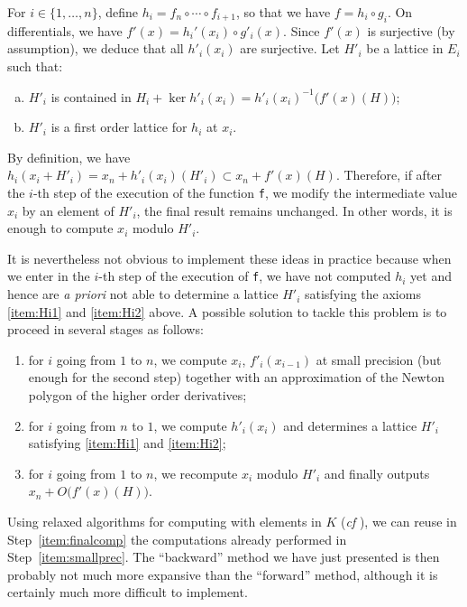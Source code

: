\documentclass{lms}
\begin{document}
For $i \in \{1, \ldots, n\}$, define $h_i = f_n \circ \cdots \circ 
f_{i+1}$, so that we have $f = h_i \circ g_i$. On differentials, we 
have $f'(x) = h_i'(x_i) \circ g'_i(x)$. Since $f'(x)$ is surjective (by 
assumption), we deduce that all $h'_i(x_i)$ are surjective. Let $H'_i$ 
be a lattice in $E_i$ such that:
\begin{enumerate}[(a)] 
\item \label{item:Hi1}
$H'_i$ is contained in $H_i + \ker h'_i(x_i) = h'_i(x_i)^{-1}
\big(f'(x)(H)\big)$;
\item \label{item:Hi2}
$H'_i$ is a first order lattice for $h_i$ at $x_i$.
\end{enumerate}
By definition, we have
$h_i(x_i + H'_i) = x_n + h'_i(x_i)(H'_i) \subset x_n + f'(x)(H)$.
Therefore, if after the $i$-th step of the execution of the function
{\tt f}, we modify the intermediate value $x_i$ by an element of
$H'_i$, the final result remains unchanged. In other words, it is
enough to compute $x_i$ modulo $H'_i$.

It is nevertheless not obvious to implement these ideas in practice
because when we enter in the $i$-th step of the execution of {\tt f},
we have not computed $h_i$ yet and hence are \emph{a priori} not able
to determine a lattice $H'_i$ satisfying the axioms \eqref{item:Hi1}
and \eqref{item:Hi2} above.
A possible solution to tackle this problem is to proceed in several
stages as follows: 
\begin{enumerate}[(1)]
\item \label{item:smallprec}
for $i$ going from $1$ to $n$, we compute $x_i$, $f'_i(x_{i-1})$ 
at small precision (but enough for the second step) together with an
approximation of the Newton polygon of the higher order derivatives;
\item \label{item:determineHi}
for $i$ going from $n$ to $1$, we compute $h'_i(x_i)$ and
determines a lattice $H'_i$ satisfying \eqref{item:Hi1} and 
\eqref{item:Hi2};
\item \label{item:finalcomp}
for $i$ going from $1$ to $n$, we recompute $x_i$ modulo $H'_i$
and finally outputs $x_n + O\big(f'(x)(H)\big)$.
\end{enumerate}
Using relaxed algorithms for computing with elements in $K$ (\emph{cf} 
\cite{hoeven1, hoeven2, berthomieu}), we can reuse in 
Step~\eqref{item:finalcomp} the computations already performed in 
Step~\eqref{item:smallprec}. The ``backward'' method we have just 
presented is then probably not much more expansive than the ``forward'' 
method, although it is certainly much more difficult to implement.
\end{document}
